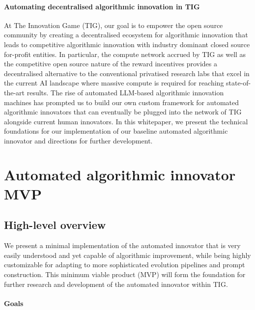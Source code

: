 \documentclass[12pt, legalpaper]{article}
\begin{document}
\paragraph{Automating decentralised algorithmic innovation in TIG}

At The Innovation Game (TIG), our goal is to empower the open source community by creating a decentralised ecosystem for algorithmic innovation that leads to competitive algorithmic innovation with industry dominant closed source for-profit entities. 
In particular, the compute network accrued by TIG as well as the competitive open source nature of the reward incentives provides a decentralised alternative to the conventional privatised research labs that excel in the current AI landscape where massive compute is required for reaching state-of-the-art results. 
The rise of automated LLM-based algorithmic innovation machines has prompted us to build our own custom framework for automated algorithmic innovators that can eventually be plugged into the network of TIG alongside current human innovators. 
In this whitepaper, we present the technical foundations for our implementation of our baseline automated algorithmic innovator and directions for further development. 




\section{Automated algorithmic innovator MVP}



\subsection{High-level overview}\label{sec:highlevel}

We present a minimal implementation of the automated innovator that is very easily understood and yet capable of algorithmic improvement, while being highly customizable for adapting to more sophisticated evolution pipelines and prompt construction. 
This minimum viable product (MVP) will form the foundation for further research and development of the automated innovator within TIG. 


%
\paragraph{Goals}
\end{document}
